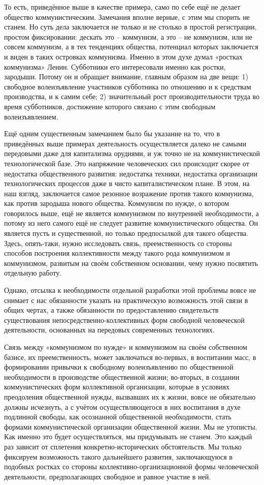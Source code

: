 \documentclass[../main]{subfiles}
\begin{document}
То есть, приведённое выше в качестве примера, само по себе ещё не делает общество коммунистическим. Замечания вполне верные, с этим мы спорить не станем. Но суть дела заключается не только и не столько в простой регистрации, простом фиксировании: дескать это – коммунизм, а это – не коммунизм, или не совсем коммунизм, а в тех тенденциях общества, потенциал которых заключается и виден в таких островках коммунизма. Именно в этом духе думал «ростках коммунизма» Ленин. Субботники его интересовали именно как ростки, зародыши. Потому он и обращает внимание, главным образом на две вещи: 1) свободное волеизъявление участников субботника по отношению и к средствам производства, и к самим себе; 2) значительный рост производительности труда во время субботников, достижение которого связано с этим свободным волеизъявлением.

Ещё одним существенным замечанием было бы указание на то, что в приведённых выше примерах деятельность осуществляется далеко не самыми передовыми даже для капитализма орудиями, и уж точно не на коммунистической технологической базе. Это напряжение человеческих сил происходит скорее от недостатка общественного развития: недостатка техники, недостатка организации технологических процессов даже в чисто капиталистическом плане. В этом, на наш взгляд, заключается самое резонное возражение против такого коммунизма, как против зародыша нового общества. Коммунизм по нужде, о котором говорилось выше, ещё не является коммунизмом по внутренней необходимости, а потому из него самого ещё не следует развитие коммунистического общества. Он является пусть и существенной, но только предпосылкой для такого общества. Здесь, опять-таки, нужно исследовать связь, преемственность со стороны способов построения коллективности между такого рода коммунизмом и коммунизмом, развитым на своём собственном основании, чему нужно посвятить отдельную работу.

Однако, отсылка к необходимости отдельной разработки этой проблемы вовсе не снимает с нас обязанности указать на практическую возможность этой связи в общих чертах, а также обязанности по предоставлению свидетельств существования непосредственно-коллективных форм свободной человеческой деятельности, основанных на передовых современных технологиях.

Связь между «коммунизмом по нужде» и коммунизмом на своём собственном базисе, их преемственность, может заключаться во-первых, в воспитании масс, в формировании привычки к свободному волеизъявлению по общественной необходимости в производстве общественной жизни; во-вторых, в создании коммунистических форм коллективной организации, которые в условиях преодоления общественной нужды, вызвавших их к жизни, вовсе не обязательно должны исчезнуть, а с учётом осуществляющегося в них воспитания в духе подлинной свободы, как осознанной общественной необходимости, стать формами коммунистической организации общественной жизни. Мы не утописты. Как именно это будет осуществляться, мы придумывать не станем. Это каждый раз зависит от сплетения конкретно-исторических обстоятельств. Мы только фиксируем возможность такого дальнейшего развития, заключающуюся в подобных ростках со стороны коллективно-организационной формы человеческой деятельности, предполагающих свободное и равное участие в ней.
\end{document}
